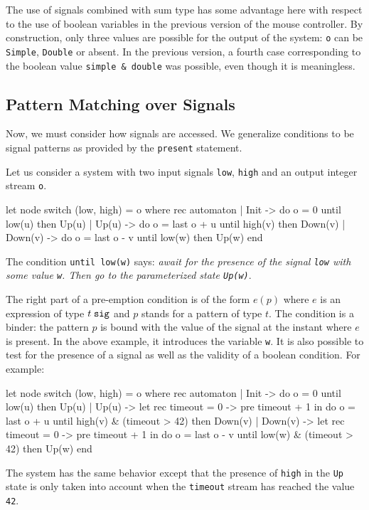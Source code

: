 \documentclass[11pt,titlepage,twoside]{report}
\begin{document}
The use of signals combined with sum type has some advantage here with
respect to the use of boolean variables in the previous version of the
mouse controller. By construction, only three values are possible for
the output of the system: \verb-o- can be \verb-Simple-, \verb-Double-
or absent. In the previous version, a fourth case corresponding to the
boolean value \verb-simple & double- was possible, even though it is meaningless.

\subsection{Pattern Matching over Signals\label{patmatchsig}} %

Now, we must consider how signals are accessed. We generalize
conditions to be signal patterns as provided by the \verb-present-
statement.

Let us consider a system with two input signals \verb-low-,
\verb-high- and an output integer stream \verb-o-.
\begin{chklisting}[withresult]
let node switch (low, high) = o where
  rec automaton
      | Init -> do o = 0 until low(u) then Up(u)
      | Up(u) ->
          do o = last o + u
          until high(v) then Down(v)
      | Down(v) ->
          do o = last o - v
          until low(w) then Up(w)
      end
\end{chklisting}

The condition \verb-until low(w)- says: {\em await for the presence of
  the signal \verb-low- with some value \verb-w-. Then go to the
  parameterized state \verb-Up(w)-}.

\newcommand{\Signal}[1]{{#1}\;\mbox{\tt sig}}

The right part of a pre-emption condition is of the form $e(p)$ where
$e$ is an expression of type $\Signal{t}$ and $p$ stands for a pattern
of type $t$. The condition is a binder: the pattern $p$ is bound with
the value of the signal at the instant where $e$ is present.  In the
above example, it introduces the variable \verb-w-. It is also
possible to test for the presence of a signal as well as the validity
of a boolean condition. For example:
\begin{chklisting}[withresult]
let node switch (low, high) = o where
  rec automaton
  | Init -> do o = 0 until low(u) then Up(u)
  | Up(u) ->
      let rec timeout = 0 -> pre timeout + 1 in
      do o = last o + u
      until high(v) & (timeout > 42) then Down(v)
  | Down(v) ->
      let rec timeout = 0 -> pre timeout + 1 in
      do o = last o - v
      until low(w) & (timeout > 42) then Up(w)
  end
\end{chklisting}
The system has the same behavior except that the presence of
\verb-high- in the \verb-Up- state is only taken into account when the
\verb-timeout- stream has reached the value \verb-42-.
\end{document}
